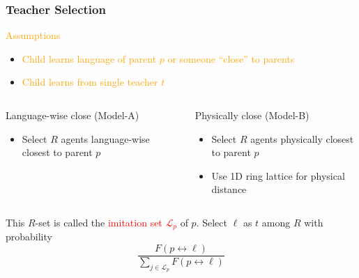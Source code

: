 \documentclass{beamer}
\newcommand{\hbDefined}[1]{\textcolor{red}{{#1}}}
\newcommand{\hbEmph}[1]{\textcolor{orange}{#1}}
\theoremstyle{plain}
\theoremstyle{definition}
\theoremstyle{remark}
\begin{document}
\begin{frame}\frametitle{Teacher Selection}
	\hbEmph{Assumptions}
\begin{itemize}

	\item 
	\hbEmph{Child learns language of parent $p$ or someone ``close'' to parents}
	
	\item
	\hbEmph{Child learns from single teacher $t$}

\end{itemize}
		
		

	\begin{columns}[T]
	\begin{column}{.5\linewidth}   
	    	Language-wise close (Model-A)
		\begin{itemize}
			\item
			Select $R$ agents language-wise closest to parent $p$
		\end{itemize}
	\end{column}
	\begin{column}{.5\linewidth}
	    	Physically close (Model-B)
		\begin{itemize}
			\item
			Select $R$ agents physically closest to parent $p$
			
			\item
			Use 1D ring lattice for physical distance
			
		\end{itemize}
	\end{column}
	\end{columns}

	This $R$-set is called the \hbDefined{imitation set} \hbDefined{$\mathcal{L}_{p}$} of $p$.
	Select $\ell$ as $t$ among $R$ with probability
	\[
		\frac
			{F(p \leftrightarrow \ell)}
			{\sum_{j \in \mathcal{L}_{p}} F(p \leftrightarrow \ell)}
	\]

\end{frame}
\end{document}
